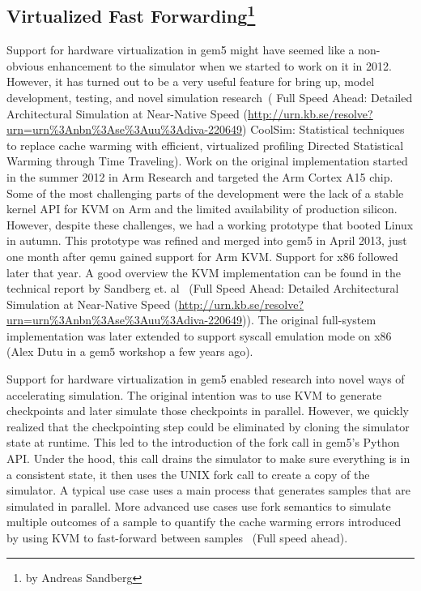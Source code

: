 \subsection[Virtualized Fast Forwarding]{Virtualized Fast Forwarding\footnote{by Andreas Sandberg}}

Support for hardware virtualization in gem5 might have seemed like a non-obvious enhancement to the simulator when we started to work on it in 2012.
However, it has turned out to be a very useful feature for bring up, model development, testing, and novel simulation research~\cite{}(
Full Speed Ahead: Detailed Architectural Simulation at Near-Native Speed (\url{http://urn.kb.se/resolve?urn=urn%3Anbn%3Ase%3Auu%3Adiva-220649})
CoolSim: Statistical techniques to replace cache warming with efficient, virtualized profiling
Directed Statistical Warming through Time Traveling).
Work on the original implementation started in the summer 2012 in Arm Research and targeted the Arm Cortex A15 chip. Some of the most challenging parts of the development were the lack of a stable kernel API for KVM on Arm and the limited availability of production silicon.
However, despite these challenges, we had a working prototype that booted Linux in autumn.
This prototype was refined and merged into gem5 in April 2013, just one month after qemu gained support for Arm KVM.
Support for x86 followed later that year.
A good overview the KVM implementation can be found in the technical report by Sandberg et. al~\cite{} (Full Speed Ahead: Detailed Architectural Simulation at Near-Native Speed (\url{http://urn.kb.se/resolve?urn=urn%3Anbn%3Ase%3Auu%3Adiva-220649})).
The original full-system implementation was later extended to support syscall emulation mode on x86~\cite{} (Alex Dutu in a gem5 workshop a few years ago).

Support for hardware virtualization in gem5 enabled research into novel ways of accelerating simulation.
The original intention was to use KVM to generate checkpoints and later simulate those checkpoints in parallel.
However, we quickly realized that the checkpointing step could be eliminated by cloning the simulator state at runtime.
This led to the introduction of the fork call in gem5's Python API.
Under the hood, this call drains the simulator to make sure everything is in a consistent state, it then uses the UNIX fork call to create a copy of the simulator.
A typical use case uses a main process that generates samples that are simulated in parallel.
More advanced use cases use fork semantics to simulate multiple outcomes of a sample to quantify the cache warming errors introduced by using KVM to fast-forward between samples~\cite{} (Full speed ahead).
